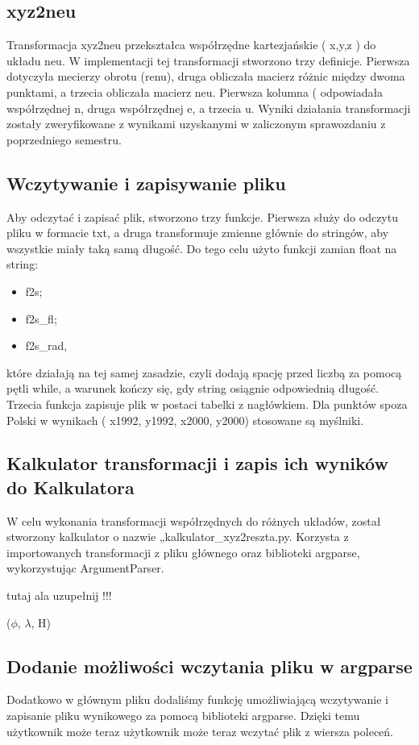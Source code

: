 \documentclass[10pt,a4paper]{article}
\begin{document}
	
	\subsection{xyz2neu} 
	Transformacja xyz2neu przekształca współrzędne kartezjańskie ( x,y,z ) do układu neu. W implementacji tej transformacji stworzono trzy definicje. Pierwsza dotyczyła mecierzy obrotu (renu), druga obliczała macierz różnic między dwoma punktami, a trzecia obliczała macierz neu. Pierwsza kolumna ( odpowiadała współrzędnej n, druga współrzędnej e, a trzecia u. Wyniki działania transformacji zostały zweryfikowane z wynikami uzyskanymi w zaliczonym sprawozdaniu z poprzedniego semestru. 
	\newpage
	\subsection{Wczytywanie i zapisywanie pliku}
	Aby odczytać i zapisać plik, stworzono trzy funkcje. Pierwsza służy do odczytu pliku w formacie txt, a druga transformuje zmienne głównie do stringów, aby wszystkie miały taką samą długość. Do tego celu użyto funkcji zamian float na string: 

	\begin{itemize}
		\item f2s;
		\item f2s_fl;
		\item f2s_rad,

	\end{itemize}
	które działają na tej samej zasadzie, czyli dodają spację przed liczbą za pomocą pętli while, a warunek kończy się, gdy string osiągnie odpowiednią długość. Trzecia funkcja zapisuje plik w postaci tabelki z nagłówkiem. Dla punktów spoza Polski w wynikach ( x1992, y1992, x2000, y2000) stosowane są myślniki.

	\subsection{Kalkulator transformacji i zapis ich wyników do Kalkulatora}
	W celu wykonania transformacji współrzędnych do różnych układów, został stworzony kalkulator o nazwie „kalkulator_xyz2reszta.py. Korzysta z importowanych transformacji z pliku głównego oraz biblioteki argparse, wykorzystując ArgumentParser. 
	
	tutaj ala uzupełnij !!!

	($\phi$, $\lambda$, H) 

	
	\subsection{Dodanie możliwości wczytania pliku w argparse}
	Dodatkowo w głównym pliku dodaliśmy funkcję umożliwiającą wczytywanie i zapisanie pliku wynikowego za pomocą biblioteki argparse. Dzięki temu użytkownik może teraz użytkownik może teraz wczytać plik z wiersza poleceń. 

	

		
\end{document}

